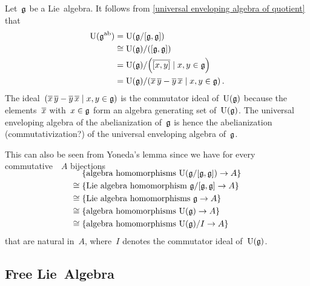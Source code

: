 \begin{example}
	Let~$\mathfrak{g}$ be a Lie~algebra.
	It follows from \cref{universal enveloping algebra of quotient} that
	\begin{align*}
		\Univ( \glie^{\ab} )
		&=
		\Univ( \glie/[\glie, \glie] )
		\\
		&\cong
		\Univ(\glie) / \ideal{[\glie, \glie]}
		\\
		&=
		\Univ(\glie)
		/
		\ideal[\Big]{ \class{[x,y]} \suchthat x, y \in \glie }
		\\
		&=
		\Univ(\glie)
		/
		\ideal{
			\class{x} \, \class{y} - \class{y} \, \class{x}
		\suchthat
			x, y \in \glie
		} \,.
	\end{align*}
	The ideal~$\ideal{ \class{x} \, \class{y} - \class{y} \, \class{x} \suchthat x, y \in \glie }$ is the commutator ideal of~$\operatorname{U}(\mathfrak{g})$ because the elements~$\overline{x}$ with~$x \in \mathfrak{g}$ form an algebra generating set of~$\operatorname{U}(\mathfrak{g})$.
	The universal enveloping algebra of the abelianization of~$\mathfrak{g}$ is hence the abelianization (commutativization?) of the universal enveloping algebra of~$\mathfrak{g}$.
	
	This can also be seen from Yoneda’s lemma since we have for every commutative~{\algebra{$\kf$}}~$A$ bijections
	\begin{align*}
		\SwapAboveDisplaySkip
		{}&
		\{ \textstyle\text{algebra homomorphisms~$\Univ(\glie/[\glie,\glie]) \to A$} \}
		\\
		\cong{}&
		\{ \textstyle\text{Lie~algebra homomorphism~$\glie/[\glie, \glie] \to A$} \}
		\\
		\cong{}&
		\{ \textstyle\text{Lie~algebra homomorphisms~$\glie \to A$} \}
		\\
		\cong{}&
		\{ \textstyle\text{algebra homomorphisms~$\Univ(\glie) \to A$} \}
		\\
		\cong{}&
		\{ \textstyle\text{algebra homomorphisms~$\Univ(\glie)/I \to A$} \}
	\end{align*}
	that are natural in~$A$, where~$I$ denotes the commutator ideal of~$\operatorname{U}(\mathfrak{g})$.
\end{example}





\subsection{Free Lie~Algebra}


